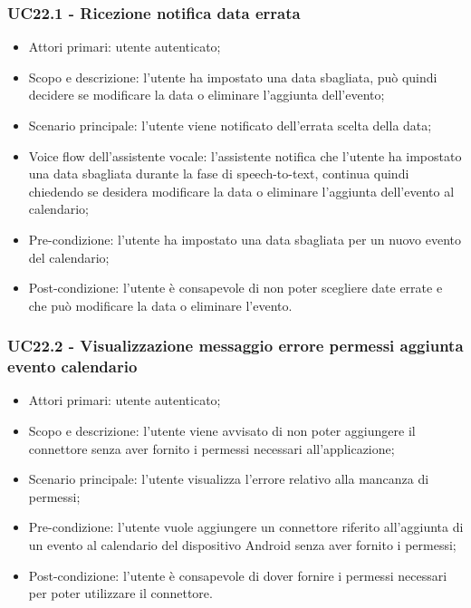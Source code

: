 \subsubsection{UC22.1 - Ricezione notifica data errata}
\begin{itemize}
	\item  Attori primari: utente autenticato;
	\item  Scopo e descrizione: l'utente ha impostato una data sbagliata, può quindi decidere se modificare la data o eliminare l'aggiunta dell'evento;
	\item  Scenario principale: l'utente viene notificato dell'errata scelta della data;
	\item  Voice flow dell'assistente vocale: l'assistente notifica che l'utente ha impostato una data sbagliata durante la fase di speech-to-text, continua quindi chiedendo se desidera modificare la data o eliminare l'aggiunta dell'evento al calendario;
	\item  Pre-condizione: l'utente ha impostato una data sbagliata per un nuovo evento del calendario;
	\item  Post-condizione: l'utente è consapevole di non poter scegliere date errate e che può modificare la data o eliminare l'evento.
\end{itemize}
\subsubsection{UC22.2 - Visualizzazione messaggio errore permessi aggiunta evento calendario}
\begin{itemize}
	\item  Attori primari: utente autenticato;
	\item  Scopo e descrizione: l'utente viene avvisato di non poter aggiungere il connettore senza aver fornito i permessi necessari all'applicazione;
	\item  Scenario principale: l'utente visualizza l'errore relativo alla mancanza di permessi;
	\item  Pre-condizione: l'utente vuole aggiungere un connettore riferito all'aggiunta di un evento al calendario del dispositivo Android senza aver fornito i permessi;
	\item  Post-condizione: l'utente è consapevole di dover fornire i permessi necessari per poter utilizzare il connettore.
\end{itemize}

